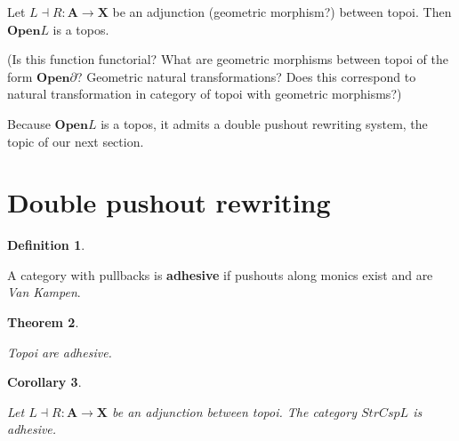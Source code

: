 \documentclass{amsart}
\newcommand{\A}{\cat{A}}
\newcommand{\X}{\cat{X}}
\newcommand{\defn}[1]{\textbf{#1}}
\newcommand{\cat}[1]{\mathbf{#1}}
\newcommand{\from}{\colon}
\newcommand{\OpenOb}{\mathbf{Open} }
\newcommand{\edit}[1]{\textcolor{editcolour}{(#1)}}
\newenvironment{exposition}[1]{}{}
\newtheorem{theorem}{Theorem}[section]
\newtheorem{corollary}[theorem]{Corollary}
\theoremstyle{remark}
\theoremstyle{definition}
\newtheorem{definition}[theorem]{Definition}
\begin{document}
\begin{thm}
  \label{thm:OpenObTopos}

  Let $ L \dashv R \from \A \to \X $ be an adjunction
  (geometric morphism?) between topoi.  Then $ \OpenOb{L} $ is
  a topos.
  
\end{thm}

\edit{Is this function functorial?  What are geometric morphisms
  between topoi of the form $ \OpenOb{\partial} $?  Geometric natural
  transformations?  Does this correspond to natural transformation in
  category of topoi with geometric morphisms?}

\begin{exposition}{}

  Because $ \OpenOb{L} $ is a topos, it admits a double
  pushout rewriting system, the topic of our next section.

\end{exposition}


\section{Double pushout rewriting} \label{sec:double-push-rewr} 

\begin{definition}
\label{df:dpo_adhesive-category} 
	
  A category with pullbacks is \defn{adhesive} if pushouts along
  monics exist and are \emph{Van Kampen}.

\end{definition} 

\begin{theorem}
\label{thm:dpo_topoi-adhesive} 
	
  Topoi are adhesive.
	
\end{theorem}


\begin{corollary}
\label{thm:dpo_category-StrCsp-adhsv}
 	
  Let $ L \dashv R \from \A \to \X $ be an adjunction between topoi.
  The category $ StrCsp{L} $ is adhesive.
 	
\end{corollary}
\end{document}
